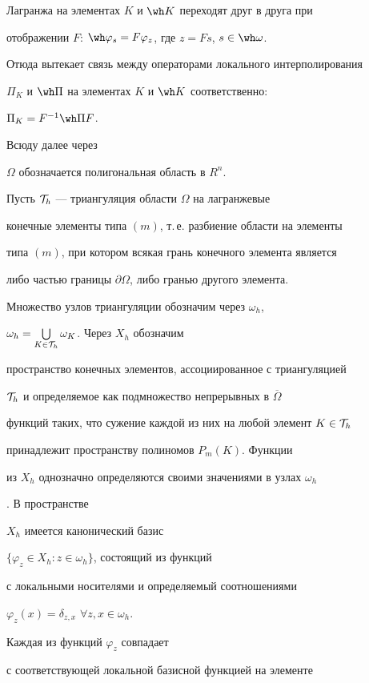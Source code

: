 Лагранжа на элементах $K$ и $\wh K$ переходят друг в друга при 


отображении $F$: $\wh \varphi_s=F\varphi_z$, где $z=Fs$, $s\in\wh\omega$. 


Отюда вытекает связь между операторами локального интерполирования 


$\Pi_K$ и $\wh \Pi$ на элементах $K$ и $\wh K$ соответственно: 


$\Pi_K=F^{-1}\wh \Pi F$. 





Всюду далее через 


$\Omega$ обозначается полигональная область в $R^n$. 


Пусть ${\cal T}_h$ --- триангуляция области $\Omega$ на лагранжевые 


конечные элементы типа $(m)$, т.\,е. разбиение области на элементы 


типа $(m)$, при котором всякая грань конечного элемента является 


либо частью границы $\partial \Omega$, либо гранью другого элемента. 


Множество узлов триангуляции обозначим через $\omega_h$, 


$\omega_h=\bigcup \limits_{K \in {\cal T}_h} \omega_K$. Через $X_h$ обозначим 


пространство конечных элементов, ассоциированное с триангуляцией 


${\cal T}_h$ и определяемое как подмножество непрерывных в $\overline{\Omega}$ 


функций таких, что сужение каждой из них на любой элемент $K \in {\cal T}_h$ 


принадлежит пространству полиномов $P_m(K)$. Функции 


из $X_h$ однозначно определяются своими значениями в узлах $\omega_h$ 


\cite{Ciarlet}. В пространстве 


$X_h$ имеется канонический базис


$\{\varphi_z \in X_h:z \in \omega_h \}$, состоящий из функций 


с локальными носителями и определяемый соотношениями 


$\varphi_z(x)=\delta_{z,x}$ $\forall z,x \in \omega_h.$


Каждая из функций $\varphi_z$ совпадает 


с соответствующей локальной базисной функцией на элементе 


